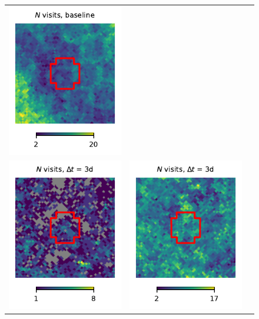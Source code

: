 \documentclass[preprintm,linenumbers]{aastex631}
\begin{document}
\begin{figure}
\begin{tabular}{  c c c}
				\includegraphics{results/skymaps_cutout/skymaps_cutout_first_year_one_snap_v4_0_10yrs_db_noDD_noTwi_nside-256_CountMetric_r_GP_noDD_noTwi.pdf} \\
				\includegraphics{results/skymaps_cutout/skymaps_cutout_first_year_one_snap_v4_0_10yrs_db_noDD_noTwi_tscale-3_nside-256_doAllTemplateMetrics_reduceCount_r_NES_noDD_noTwi.pdf} &
				\includegraphics{results/skymaps_cutout/skymaps_cutout_first_year_one_snap_v4_0_10yrs_db_noDD_noTwi_tscale-3_nside-256_doAllTemplateMetrics_reduceCount_r_WFD_noDD_noTwi.pdf} &

\end{tabular}
\end{figure}
\end{document}
